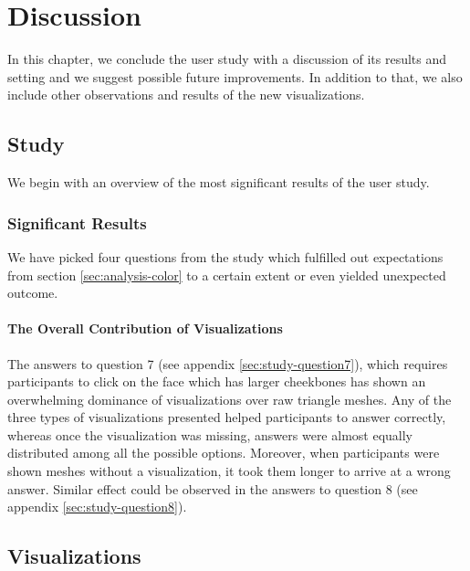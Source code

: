 \chapter{Discussion}

In this chapter, we conclude the user study with a discussion of its results and setting and we suggest possible future improvements. In addition to that, we also include other observations and results of the new visualizations.

\section{Study}

We begin with an overview of the most significant results of the user study.

\subsection{Significant Results}

We have picked four questions from the study which fulfilled out expectations from section \ref{sec:analysis-color} to a certain extent or even yielded unexpected outcome.

\subsubsection{The Overall Contribution of Visualizations}

The answers to question 7 (see appendix \ref{sec:study-question7}), which requires participants to click on the face which has larger cheekbones has shown an overwhelming dominance of visualizations over raw triangle meshes. Any of the three types of visualizations presented helped participants to answer correctly, whereas once the visualization was missing, answers were almost equally distributed among all the possible options. Moreover, when participants were shown meshes without a visualization, it took them longer to arrive at a wrong answer. Similar effect could be observed in the answers to question 8 (see appendix \ref{sec:study-question8}).

\section{Visualizations}